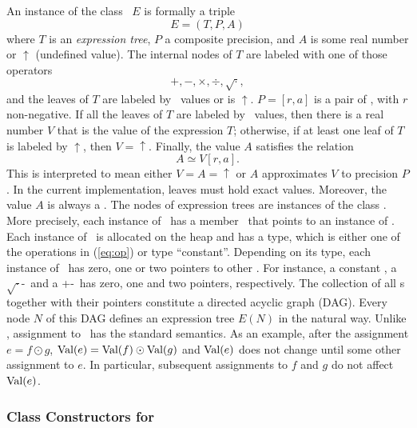 An instance of the class \expr\ $ E $ is formally a triple
$$ E = ( T, P, A )$$
where $T$ is an {\em expression tree},
$P$ a composite precision,
and $A$ is some real number or $\uparrow$ (undefined value).
The internal nodes of $T$
are labeled with one of those operators
	\begin{equation}\label{eq:op}
	 +, -, \times, \div, \sqrt{\cdot},
	\end{equation}
and the leaves of $T$ are labeled by \real\ values or is $\uparrow$.
$P=[r,a]$ is a pair of \extlong, with $ r $ non-negative.
If all the leaves of $T$ are labeled by \real\ values, then
there is a real number $V$ that is the value of the expression $T$;
otherwise, if at least one leaf of $T$ is labeled by $\uparrow$, then $V=\uparrow$.
Finally, the value $A$ satisfies the relation
	$$A\simeq V [r,a].$$
This is interpreted to mean either $V=A=\uparrow$ or
$A$ approximates $V$ to precision $P$.
In the current implementation, leaves must hold exact values.
Moreover, the value $A$ is always a \BF.
The nodes of expression trees are instances of the
class \exprep.  More precisely,
each instance of \expr\ has a member \rep\ that points
to an instance of \exprep.  Each instance of \exprep\ is allocated on
the heap
and has a type, which is either one of the operations
in (\ref{eq:op}) or type ``constant''.
Depending on its type, each instance of \exprep\ has zero, one or two pointers
to other \exprep.  For instance, a constant \exprep,
a $\sqrt{\cdot}$-\exprep\ and a +-\exprep\ has
zero, one and two pointers, respectively.
The collection of all \exprep s together
with their pointers constitute a directed acyclic graph (DAG).
Every node $N$ of this DAG defines an expression tree $E(N)$ in the
natural way.
Unlike \cite{ouchi:thesis}, assignment to \expr\ has the standard semantics.
As an example, after the assignment $e = f \odot g$, 
$\mbox{\rm Val}(e) = \mbox{\rm Val}(f) \odot \mbox{\rm Val}(g)$ and $\mbox{\rm Val}(e)$ does not change
until some other assignment to $e$. In particular, subsequent assignments
to $f$ and $g$ do not affect $\mbox{\rm Val}(e)$.

\bigskip

\subsubsection{Class Constructors for \expr}


